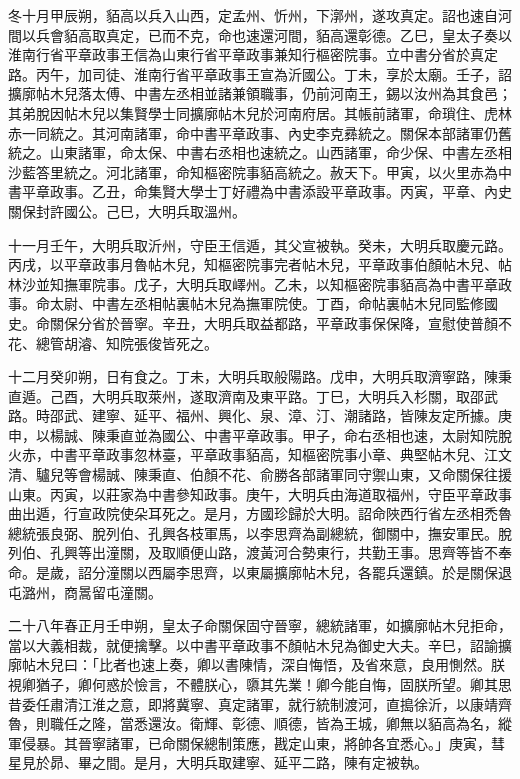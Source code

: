 \begin{pinyinscope}
 冬十月甲辰朔，貊高以兵入山西，定孟州、忻州，下漷州，遂攻真定。詔也速自河間以兵會貊高取真定，已而不克，命也速還河間，貊高還彰德。乙巳，皇太子奏以淮南行省平章政事王信為山東行省平章政事兼知行樞密院事。立中書分省於真定路。丙午，加司徒、淮南行省平章政事王宣為沂國公。丁未，享於太廟。壬子，詔擴廓帖木兒落太傅、中書左丞相並諸兼領職事，仍前河南王，錫以汝州為其食邑；其弟脫因帖木兒以集賢學士同擴廓帖木兒於河南府居。其帳前諸軍，命瑣住、虎林赤一同統之。其河南諸軍，命中書平章政事、內史李克彞統之。關保本部諸軍仍舊統之。山東諸軍，命太保、中書右丞相也速統之。山西諸軍，命少保、中書左丞相沙藍答里統之。河北諸軍，命知樞密院事貊高統之。赦天下。甲寅，以火里赤為中書平章政事。乙丑，命集賢大學士丁好禮為中書添設平章政事。丙寅，平章、內史關保封許國公。己巳，大明兵取溫州。



 十一月壬午，大明兵取沂州，守臣王信遁，其父宣被執。癸未，大明兵取慶元路。丙戌，以平章政事月魯帖木兒，知樞密院事完者帖木兒，平章政事伯顏帖木兒、帖林沙並知撫軍院事。戊子，大明兵取嶧州。乙未，以知樞密院事貊高為中書平章政事。命太尉、中書左丞相帖裏帖木兒為撫軍院使。丁酉，命帖裏帖木兒同監修國史。命關保分省於晉寧。辛丑，大明兵取益都路，平章政事保保降，宣慰使普顏不花、總管胡濬、知院張俊皆死之。



 十二月癸卯朔，日有食之。丁未，大明兵取般陽路。戊申，大明兵取濟寧路，陳秉直遁。己酉，大明兵取萊州，遂取濟南及東平路。丁巳，大明兵入杉關，取邵武路。時邵武、建寧、延平、福州、興化、泉、漳、汀、潮諸路，皆陳友定所據。庚申，以楊誠、陳秉直並為國公、中書平章政事。甲子，命右丞相也速，太尉知院脫火赤，中書平章政事忽林臺，平章政事貊高，知樞密院事小章、典堅帖木兒、江文清、驢兒等會楊誠、陳秉直、伯顏不花、俞勝各部諸軍同守禦山東，又命關保往援山東。丙寅，以莊家為中書參知政事。庚午，大明兵由海道取福州，守臣平章政事曲出遁，行宣政院使朵耳死之。是月，方國珍歸於大明。詔命陜西行省左丞相禿魯總統張良弼、脫列伯、孔興各枝軍馬，以李思齊為副總統，御關中，撫安軍民。脫列伯、孔興等出潼關，及取順便山路，渡黃河合勢東行，共勤王事。思齊等皆不奉命。是歲，詔分潼關以西屬李思齊，以東屬擴廓帖木兒，各罷兵還鎮。於是關保退屯潞州，商暠留屯潼關。



 二十八年春正月壬申朔，皇太子命關保固守晉寧，總統諸軍，如擴廓帖木兒拒命，當以大義相裁，就便擒擊。以中書平章政事不顏帖木兒為御史大夫。辛巳，詔諭擴廓帖木兒曰：「比者也速上奏，卿以書陳情，深自悔悟，及省來意，良用惻然。朕視卿猶子，卿何惑於憸言，不體朕心，隳其先業！卿今能自悔，固朕所望。卿其思昔委任肅清江淮之意，即將冀寧、真定諸軍，就行統制渡河，直搗徐沂，以康靖齊魯，則職任之隆，當悉還汝。衛輝、彰德、順德，皆為王城，卿無以貊高為名，縱軍侵暴。其晉寧諸軍，已命關保總制策應，戡定山東，將帥各宜悉心。」庚寅，彗星見於昴、畢之間。是月，大明兵取建寧、延平二路，陳有定被執。




\end{pinyinscope}
